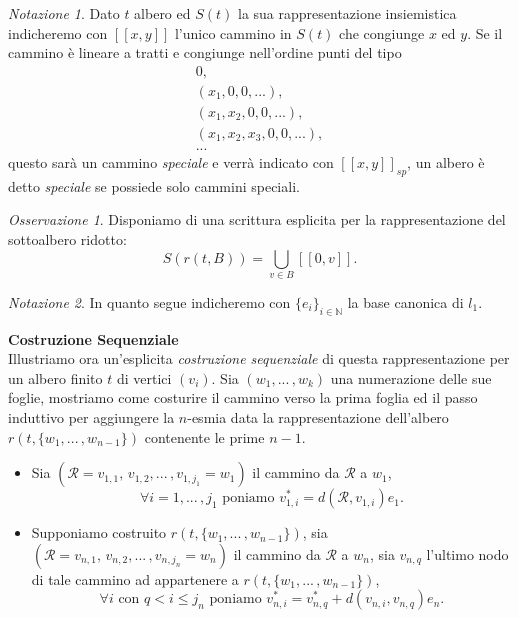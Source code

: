 \documentclass[11pt, twoside]{report}
\theoremstyle{definition}
\theoremstyle{plain}
\theoremstyle{remark}
\newtheorem{oss}{Osservazione}[chapter]
\newtheorem{notazione}{Notazione}[chapter]
\numberwithin{equation}{chapter}
\begin{document}
\begin{notazione}
Dato $t$ albero ed $S(t)$ la sua rappresentazione insiemistica indicheremo con $[[x,y]]$ l'unico cammino in $S(t)$ che congiunge $x$ ed $y$. Se il cammino è lineare a tratti e congiunge nell'ordine punti del tipo
\begin{gather}
0, \nonumber \\
(x_1, 0, 0, ...), \nonumber \\
(x_1, x_2, 0, 0, ...), \nonumber \\
(x_1, x_2, x_3, 0, 0, ...), \nonumber \\
... \nonumber
\end{gather}
questo sarà un cammino \textit{speciale} e verrà indicato con $[[x,y]]_{sp}$, un albero è detto \textit{speciale} se possiede solo cammini speciali.
\end{notazione}
\begin{oss}
Disponiamo di una scrittura esplicita per la rappresentazione del sottoalbero ridotto:
\begin{equation}
S(r(t,B))=\bigcup\limits_{v \in B} [[0,v]].
\end{equation}
\end{oss}

\begin{notazione}
In quanto segue indicheremo con $\{e_i\}_{i \in \mathbb{N}}$ la base canonica di $l_1$.
\end{notazione}

\bigskip

\textbf{Costruzione Sequenziale}\\
Illustriamo ora un'esplicita \textit{costruzione sequenziale} di questa rappresentazione per un albero finito $t$ di vertici $(v_i)$.
Sia $(w_1, ...\, ,w_k)$ una numerazione delle sue foglie, mostriamo come costurire il cammino verso la prima foglia ed il passo induttivo per aggiungere la $n$-esmia data la rappresentazione dell'albero $r(t, \{w_1, ... \, , w_{n-1}\})$ contenente le prime $n-1$.
\begin{itemize}
\item Sia $(\mathcal{R}= v_{1,1},\, v_{1,2}, ... \, ,v_{1,j_1}= w_1)$ il cammino da $\mathcal{R}$ a $w_1$,
 $$\forall i=1,...\, ,j_1 \text{ poniamo } v_{1,i}^*=d(\mathcal{R}, v_{1,i})e_1.$$ 

\item Supponiamo costruito $r(t, \{w_1, ... \, , w_{n-1}\})$, sia $(\mathcal{R}=v_{n,1}, \, v_{n,2}, ... \, ,v_{n,j_n}=w_n)$ il cammino da $\mathcal{R}$ a $w_n$, sia $v_{n,q}$ l'ultimo nodo di tale cammino ad appartenere a $r(t, \{w_1, ... \, , w_{n-1}\})$,
$$ \forall i \text{ con } q<i\leq j_n \text{ poniamo } v_{n,i}^*=v_{n,q}^*+d(v_{n,i},v_{n,q})e_n.$$
\end{itemize}
\end{document}
